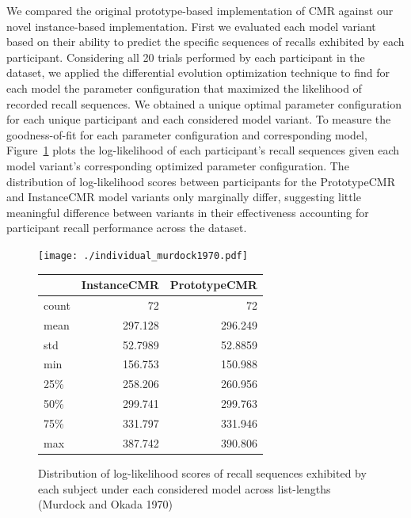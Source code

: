 \documentclass[
  letterpaper,
  DIV=11]{article}
\begin{document}
We compared the original prototype-based implementation of CMR against
our novel instance-based implementation. First we evaluated each model
variant based on their ability to predict the specific sequences of
recalls exhibited by each participant. Considering all 20 trials
performed by each participant in the dataset, we applied the
differential evolution optimization technique to find for each model the
parameter configuration that maximized the likelihood of recorded recall
sequences. We obtained a unique optimal parameter configuration for each
unique participant and each considered model variant. To measure the
goodness-of-fit for each parameter configuration and corresponding
model, Figure~\ref{fig-murdokafits} plots the log-likelihood of each
participant's recall sequences given each model variant's corresponding
optimized parameter configuration. The distribution of log-likelihood
scores between participants for the PrototypeCMR and InstanceCMR model
variants only marginally differ, suggesting little meaningful difference
between variants in their effectiveness accounting for participant
recall performance across the dataset.

\begin{figure}

\begin{minipage}[c]{1.00\linewidth}

{\centering 

\texttt{[image: ./individual\_murdock1970.pdf]}

}

\end{minipage}%
\newline
\begin{minipage}[c]{1.00\linewidth}

{\centering 

\begin{longtable}[]{@{}lrr@{}}
\toprule
& InstanceCMR & PrototypeCMR \\
\midrule
\endhead
count & 72 & 72 \\
mean & 297.128 & 296.249 \\
std & 52.7989 & 52.8859 \\
min & 156.753 & 150.988 \\
25\% & 258.206 & 260.956 \\
50\% & 299.741 & 299.763 \\
75\% & 331.797 & 331.946 \\
max & 387.742 & 390.806 \\
\bottomrule
\end{longtable}

}

\end{minipage}%

\caption{\label{fig-murdokafits}Distribution of log-likelihood scores of
recall sequences exhibited by each subject under each considered model
across list-lengths (Murdock and Okada 1970)}

\end{figure}
\end{document}
